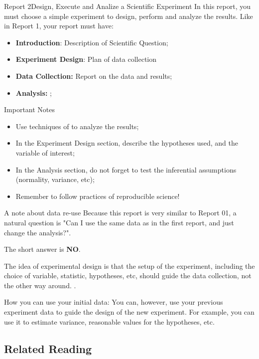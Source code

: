 \begin{frame}{Report 2}{Design, Execute and Analize a Scientific Experiment}
  In this report, you must choose a simple experiment to design, perform and analyze the results. Like in Report 1, your report must have:
  \begin{itemize}
    \item {\bf Introduction}: Description of Scientific Question;
    \item {\bf Experiment Design}: Plan of data collection 
    \item {\bf Data Collection:} Report on the data and results;
    \item {\bf Analysis:} ;
  \end{itemize}

  \begin{alertblock}{Important Notes}
    \begin{itemize}
      \item Use techniques of  to analyze the results;
      \item In the Experiment Design section, describe the hypotheses used, and the variable of interest;
      \item In the Analysis section, do not forget to test the inferential assumptions (normality, variance, etc);
      \item Remember to follow practices of reproducible science!
    \end{itemize}
  \end{alertblock}
\end{frame}

\begin{frame}{A note about data re-use}
  Because this report is very similar to Report 01, a natural question is "Can I use the same data as in the first report, and just change the analysis?".\bigskip

  \alert{The short answer is {\bf NO}}.\bigskip

  The idea of experimental design is that the setup of the experiment, including the choice of variable, statistic, hypotheses, etc, should guide the data collection, not the other way around. .

  \begin{exampleblock}{How you can use your initial data:}
    You can, however, use your previous experiment data to guide the design of the new experiment. For example, you can use it to estimate variance, reasonable values for the hypotheses, etc.
  \end{exampleblock}
\end{frame}

\subsection{Related Reading}
